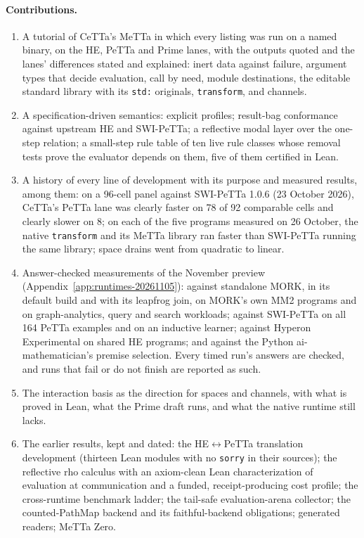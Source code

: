 \documentclass[11pt]{article}
\newcommand{\code}[1]{\texttt{#1}}
\newcommand{\PeTTa}{\textup{PeTTa}}
\newcommand{\HE}{\textup{HE}}
\newcommand{\CeTTa}{\textup{CeTTa}}
\newcommand{\PathMap}{\textup{PathMap}}
\begin{document}
\paragraph{Contributions.}
\begin{enumerate}
\item A tutorial of \CeTTa{}'s MeTTa in which every listing was run on a named
  binary, on the \HE{}, \PeTTa{} and Prime lanes, with the outputs quoted and
  the lanes' differences stated and explained: inert data against failure,
  argument types that decide evaluation, call by need, module destinations,
  the editable standard library with its \code{std:} originals, \code{transform},
  and channels.
\item A specification-driven semantics: explicit profiles; result-bag
  conformance against upstream \HE{} and SWI-\PeTTa{}; a reflective modal
  layer over the one-step relation; a small-step rule table of ten live rule
  classes whose removal tests prove the evaluator depends on them, five of them
  certified in Lean.
\item A history of every line of development with its purpose and measured
  results, among them: on a 96-cell panel against SWI-\PeTTa{} 1.0.6
  (23 October 2026), \CeTTa{}'s \PeTTa{} lane was clearly faster on 78 of 92
  comparable cells and clearly slower on 8; on each of the five programs
  measured on 26 October, the native \code{transform} and its MeTTa library
  ran faster than SWI-\PeTTa{} running the same library; space drains went
  from quadratic to linear.
\item Answer-checked measurements of the November preview
  (Appendix~\ref{app:runtimes-20261105}): against standalone MORK, in its
  default build and with its leapfrog join, on MORK's own MM2 programs and on
  graph-analytics, query and search workloads; against SWI-\PeTTa{} on all 164
  \PeTTa{} examples and on an inductive learner; against Hyperon Experimental
  on shared \HE{} programs; and against the Python ai-mathematician's premise
  selection.  Every timed run's answers are checked, and runs that fail or do
  not finish are reported as such.
\item The interaction basis as the direction for spaces and channels, with
  what is proved in Lean, what the Prime draft runs, and what the native
  runtime still lacks.
\item The earlier results, kept and dated: the
  \HE{}$\leftrightarrow$\PeTTa{} translation development (thirteen Lean
  modules with no \code{sorry} in their sources); the reflective rho
  calculus with an axiom-clean Lean characterization of evaluation at
  communication and a funded, receipt-producing cost profile; the
  cross-runtime benchmark ladder; the tail-safe evaluation-arena collector;
  the counted-\PathMap{} backend and its faithful-backend obligations;
  generated readers; MeTTa Zero.
\end{enumerate}
\end{document}
